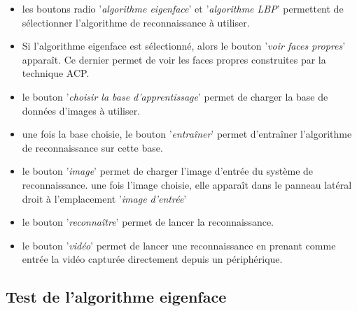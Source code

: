 \begin{itemize}
	\item [\textbullet]les boutons radio '\textit{algorithme eigenface}' et '\textit{algorithme LBP}' permettent de sélectionner l'algorithme de reconnaissance à utiliser.
	\item [\textbullet] Si l'algorithme eigenface est sélectionné, alors le bouton '\textit{voir faces propres}' apparaît. Ce dernier permet de voir les faces propres construites par la technique ACP.
	\item [\textbullet] le bouton '\textit{choisir la base d’apprentissage}' permet de charger la base de données d'images à utiliser.
	\item [\textbullet] une fois la base choisie, le bouton '\textit{entraîner}' permet d'entraîner l'algorithme de reconnaissance sur cette base.
	\item [\textbullet] le bouton '\textit{image}' permet de charger l'image d'entrée du système de reconnaissance. une fois l'image choisie, elle apparaît dans le panneau latéral droit à l'emplacement '\textit{image d'entrée}'
	\item [\textbullet] le bouton '\textit{reconnaître}' permet de lancer la reconnaissance.
	
	\item [\textbullet] le bouton '\textit{vidéo}' permet de lancer une reconnaissance en prenant comme entrée la vidéo capturée directement depuis un périphérique.
	\end{itemize}
	
	\subsection{Test de l'algorithme eigenface}
	

